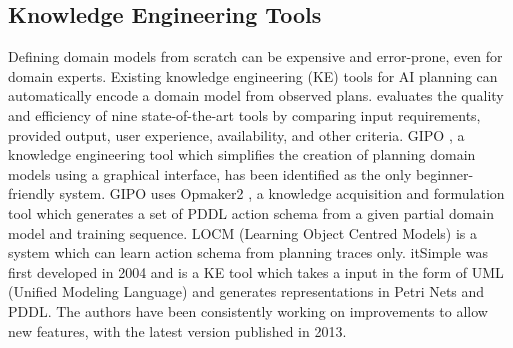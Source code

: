 \subsection{Knowledge Engineering Tools}\label{subsec:Knowledge Engineering}
Defining domain models from scratch can be expensive and error-prone, even for domain experts.
Existing knowledge engineering (KE) tools for AI planning can automatically encode a domain model from observed plans.
\cite{jilani2014automated} evaluates the quality and efficiency of nine state-of-the-art tools by comparing input requirements, provided output, user experience, availability, and other criteria.
GIPO \cite{simpson2007planning}, a knowledge engineering tool which simplifies the creation of planning domain models using a graphical interface, has been identified as the only beginner-friendly system.
GIPO uses Opmaker2 \cite{mccluskey2009automated}, a knowledge acquisition and formulation tool which generates a set of PDDL action schema from a given partial domain model and training sequence.
LOCM (Learning Object Centred Models) \cite{cresswell2013acquiring} is a system which can learn action schema from planning traces only.
itSimple \cite{vaquero2013itsimple} was first developed in 2004 and is a KE tool which takes a input in the form of UML (Unified Modeling Language) \cite{omg2005unified} and generates representations in Petri Nets \cite{murata1989petri} and PDDL. The authors have been consistently working on improvements to allow new features, with the latest version published in 2013.